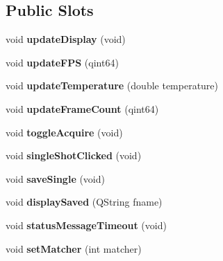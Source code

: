 \subsection*{Public Slots}
\begin{DoxyCompactItemize}
\item 
\hypertarget{class_main_window_a868f3d9f348391b74184bc94dcc118e3}{}void {\bfseries update\+Display} (void)\label{class_main_window_a868f3d9f348391b74184bc94dcc118e3}

\item 
\hypertarget{class_main_window_a56ebe4326012743d86f097d2338480f8}{}void {\bfseries update\+F\+P\+S} (qint64)\label{class_main_window_a56ebe4326012743d86f097d2338480f8}

\item 
\hypertarget{class_main_window_a1b4b4a8946e42e552dd750017d531fd1}{}void {\bfseries update\+Temperature} (double temperature)\label{class_main_window_a1b4b4a8946e42e552dd750017d531fd1}

\item 
\hypertarget{class_main_window_aa2b38963b399e878dc42f9533a41573f}{}void {\bfseries update\+Frame\+Count} (qint64)\label{class_main_window_aa2b38963b399e878dc42f9533a41573f}

\item 
\hypertarget{class_main_window_a05ff6c00dc738e54a284e22d11d982e9}{}void {\bfseries toggle\+Acquire} (void)\label{class_main_window_a05ff6c00dc738e54a284e22d11d982e9}

\item 
\hypertarget{class_main_window_a471dce2a5fbc004c344d7207e7aa8b3e}{}void {\bfseries single\+Shot\+Clicked} (void)\label{class_main_window_a471dce2a5fbc004c344d7207e7aa8b3e}

\item 
\hypertarget{class_main_window_af0c7c203e4f8d0b953c7c94d7724d8b2}{}void {\bfseries save\+Single} (void)\label{class_main_window_af0c7c203e4f8d0b953c7c94d7724d8b2}

\item 
\hypertarget{class_main_window_a5c4947f5e5a4b2e305ea4445873e162f}{}void {\bfseries display\+Saved} (Q\+String fname)\label{class_main_window_a5c4947f5e5a4b2e305ea4445873e162f}

\item 
\hypertarget{class_main_window_ae58c31493b548d8de907b152596f459e}{}void {\bfseries status\+Message\+Timeout} (void)\label{class_main_window_ae58c31493b548d8de907b152596f459e}

\item 
\hypertarget{class_main_window_a7b297a2ed4f3c64cd0cf6531ed7f9bee}{}void {\bfseries set\+Matcher} (int matcher)\label{class_main_window_a7b297a2ed4f3c64cd0cf6531ed7f9bee}


\end{DoxyCompactItemize}

